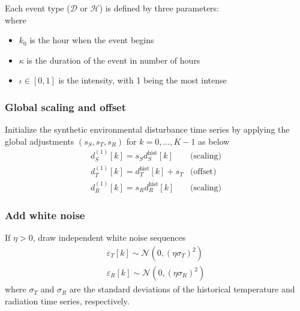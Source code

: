 \documentclass[preprint,12pt]{elsarticle}
\begin{document}
Each event type ($\mathcal{D}$ or $\mathcal{H}$) is defined by three parameters:
\begin{equation}
[k_{0}, \kappa, \iota]
\label{eqn:event}
\end{equation}
where
\begin{itemize}
\item $k_{0}$ is the hour when the event begins
\item $\kappa$ is the duration of the event in number of hours
\item $\iota\in[0,1]$ is the intensity, with 1 being the most intense
\end{itemize}

\subsubsection{Global scaling and offset}\label{subsubsec:weather-step-1}

Initialize the synthetic environmental disturbance time series by applying the global adjustments $(s_{S}, s_{T}, s_{R})$ for $k=0,...,K-1$ as below
\begin{equation}
\begin{array}{ll}
d_{S}^{(1)}[k] = s_{S}d_{S}^{\text{hist}}[k]    & \text{(scaling)} \\[7pt]
d_{T}^{(1)}[k] = d_{T}^{\text{hist}}[k] + s_{T} & \text{(offset)}  \\[7pt]
d_{R}^{(1)}[k] = s_{R}d_{R}^{\text{hist}}[k]    & \text{(scaling)}
\end{array}
\label{eqn:global-scaling}
\end{equation}

\subsubsection{Add white noise}\label{subsubsec:weather-step-2}

If $\eta > 0$, draw independent white noise sequences
\begin{align}
\varepsilon_{T}[k] \sim \mathcal{N}(0, (\eta\sigma_{T})^{2}) \\
\varepsilon_{R}[k] \sim \mathcal{N}(0, (\eta\sigma_{R})^{2})
\label{eqn:varepsilon}
\end{align}
where $\sigma_{T}$ and $\sigma_{R}$ are the standard deviations of the historical temperature and radiation time series, respectively.
\end{document}
